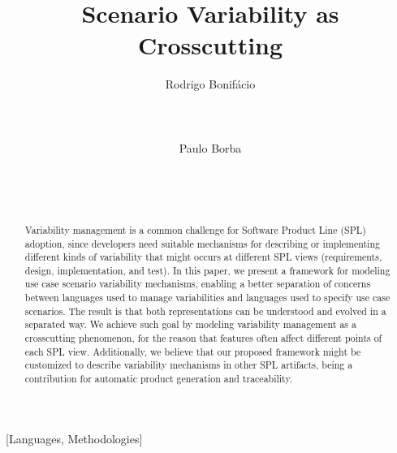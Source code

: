 \documentclass{acm_proc_article-sp}
\begin{document}
\lstset{language=Haskell, numbers=left,
numberstyle=\tiny,numbersep=5pt,basicstyle=\scriptsize,aboveskip=20pt}

\title{Scenario Variability as Crosscutting}



\author{
\alignauthor
Rodrigo Bonif\'{a}cio\\
       \\
       \\
       \\
\alignauthor
Paulo Borba\\
       \\
       \\
       \\
}

\maketitle              

\begin{abstract}
Variability management is a common challenge for Software Product
Line (SPL) adoption, since developers need suitable
mechanisms for describing or implementing different kinds of variability
that might occurs at different SPL views (requirements, design,
implementation, and test). In this paper, we present a framework for
modeling use case scenario variability mechanisms, enabling a better
separation of concerns between languages used to manage
variabilities and languages used to specify use case scenarios. The
result is that both representations can be understood and evolved in
a separated way. We achieve such goal by modeling variability management
as a crosscutting phenomenon, for the reason that features often affect
different points of each SPL view. Additionally, we believe that our proposed framework might be customized to 
describe variability mechanisms in other SPL artifacts, being a contribution for automatic product generation and traceability.
\end{abstract}

[Languages,
Methodologies]\

\end{document}
